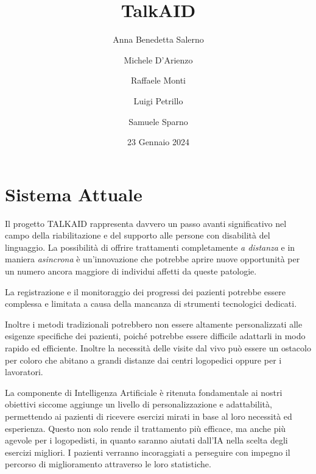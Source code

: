 \documentclass{article}
\begin{document}
\pagestyle{fancy}
\fancyhead{}

    \title{TalkAID}
    \author{
        Anna Benedetta Salerno\\
        \and
        Michele D'Arienzo\\
        \and
        Raffaele Monti\\
        \and
        Luigi Petrillo\\
        \and
        Samuele Sparno\\
    }
    \date{23 Gennaio 2024}

    \maketitle

    \pagebreak

    \tableofcontents

    \pagebreak
    
    \section{Sistema Attuale}

    Il progetto TALKAID rappresenta davvero un passo avanti significativo nel campo della riabilitazione e del supporto alle persone con disabilità del linguaggio. La possibilità di offrire trattamenti completamente \textit{a distanza} e in maniera \textit{asincrona} è un'innovazione che potrebbe aprire nuove opportunità per un numero ancora maggiore di individui affetti da queste patologie.

    La registrazione e il monitoraggio dei progressi dei pazienti potrebbe essere complessa e limitata a causa della mancanza di strumenti tecnologici dedicati.

    Inoltre i metodi tradizionali potrebbero non essere altamente personalizzati alle esigenze specifiche dei pazienti, poiché potrebbe essere difficile adattarli in modo rapido ed efficiente. Inoltre la necessità delle visite dal vivo può essere un ostacolo per coloro che abitano a grandi distanze dai centri logopedici oppure per i lavoratori.

    

    La componente di Intelligenza Artificiale è ritenuta fondamentale ai nostri obiettivi siccome aggiunge un livello di personalizzazione e adattabilità, permettendo ai pazienti di ricevere esercizi mirati in base al loro necessità ed esperienza. Questo non solo rende il trattamento più efficace, ma anche più agevole per i logopedisti, in quanto saranno aiutati dall'IA nella scelta degli esercizi migliori. I pazienti verranno incoraggiati a perseguire con impegno il percorso di miglioramento attraverso le loro statistiche.
\end{document}
